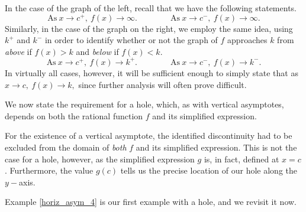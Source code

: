 \documentclass[12pt]{book}
\theoremstyle{definition}
\begin{document}
In the case of the graph of the left, recall that we have the following statements.
$$\text{As} \ x\rightarrow c^+, \ f(x)\rightarrow \infty. \qquad\qquad \text{As} \ x\rightarrow c^-, \ f(x)\rightarrow \infty.$$
Similarly, in the case of the graph on the right, we employ the same idea, using $k^+$ and $k^-$ in order to identify whether or not the graph of $f$ approaches $k$ from {\it above} if $f(x)>k$ and {\it below} if $f(x)<k$.
$$\text{As} \ x\rightarrow c^+, \ f(x)\rightarrow k^+. \qquad\qquad \text{As} \ x\rightarrow c^-, \ f(x)\rightarrow k^-.$$
In virtually all cases, however, it will be sufficient enough to simply state that as $x\rightarrow c, \ f(x)\rightarrow k,$ since further analysis will often prove difficult.
\par
We now state the requirement for a hole, which, as with vertical asymptotes, depends on both the rational function $f$ and its simplified expression.
\begin{center}
\end{center}
For the existence of a vertical asymptote, the identified discontinuity had to be excluded from the domain of {\it both} $f$ and its simplified expression.  This is not the case for a hole, however, as the simplified expression $g$ is, in fact, defined at $x=c$.  Furthermore, the value $g(c)$ tells us the precise location of our hole along the $y-$axis.

Example \ref{horiz_asym_4} is our first example with a hole, and we revisit it now.
\end{document}
